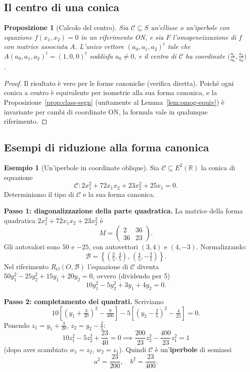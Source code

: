 \documentclass[11pt, a4paper]{book}
\theoremstyle{definition}
\newtheorem{esempio}[definizione]{Esempio}
\theoremstyle{plain}
\newtheorem{proposizione}[definizione]{Proposizione}
\theoremstyle{remark}
\newcommand{\R}{\mathbb{R}}
\begin{document}
\subsection{Il centro di una conica}

\begin{proposizione}[Calcolo del centro]
\label{prop:centro-conica}
Sia $\mathcal{C} \subseteq S$ un'ellisse o un'iperbole con equazione $f(x_1,x_2) = 0$ in un riferimento ON, e sia $F$ l'omogeneizzazione di $f$ con matrice associata $A$. L'unico vettore $(a_0, a_1, a_2)^t$ tale che $A(a_0, a_1, a_2)^t = (1, 0, 0)^t$ soddisfa $a_0 \neq 0$, e il centro di $\mathcal{C}$ ha coordinate $\bigl(\frac{a_1}{a_0}, \frac{a_2}{a_0}\bigr)$.
\end{proposizione}

\begin{proof}
Il risultato è vero per le forme canoniche (verifica diretta). Poiché ogni conica a centro è equivalente per isometrie alla sua forma canonica, e la Proposizione~\ref{prop:class-segn} (unitamente al Lemma~\ref{lem:omog-equiv}) è invariante per cambi di coordinate ON, la formula vale in qualunque riferimento.
\end{proof}

\subsection{Esempi di riduzione alla forma canonica}

\begin{exbox}
\begin{esempio}[Un'iperbole in coordinate oblique]
\label{es:iperbole-calc}
Sia $\mathcal{C} \subseteq E^2(\R)$ la conica di equazione
\[
  \mathcal{C} \colon 2x_1^2 + 72x_1 x_2 + 23x_2^2 + 25x_1 = 0.
\]
Determiniamo il tipo di $\mathcal{C}$ e la sua forma canonica.

\textbf{Passo 1: diagonalizzazione della parte quadratica.} La matrice della forma quadratica $2x_1^2 + 72x_1x_2 + 23x_2^2$ è
\[
  M = \begin{pmatrix} 2 & 36 \\ 36 & 23 \end{pmatrix}.
\]
Gli autovalori sono $50$ e $-25$, con autovettori $(3,4)$ e $(4,-3)$. Normalizzando:
\[
  \mathcal{B} = \left\{ \left(\tfrac{3}{5}, \tfrac{4}{5}\right),\, \left(\tfrac{4}{5}, -\tfrac{3}{5}\right) \right\}.
\]
Nel riferimento $R_O(O, \mathcal{B})$ l'equazione di $\mathcal{C}$ diventa $50y_1^2 - 25y_2^2 + 15y_1 + 20y_2 = 0$, ovvero (dividendo per 5)
\[
  10y_1^2 - 5y_2^2 + 3y_1 + 4y_2 = 0.
\]

\textbf{Passo 2: completamento dei quadrati.} Scriviamo
\[
  10\!\left[\left(y_1 + \tfrac{3}{20}\right)^2 - \tfrac{9}{400}\right] - 5\!\left[\left(y_2 - \tfrac{2}{5}\right)^2 - \tfrac{4}{25}\right] = 0.
\]
Ponendo $z_1 = y_1 + \frac{3}{20}$, $z_2 = y_2 - \frac{2}{5}$:
\[
  10z_1^2 - 5z_2^2 + \frac{23}{40} = 0 \implies \frac{200}{23}z_2^2 - \frac{400}{23}z_1^2 = 1
\]
(dopo aver scambiato $w_1 = z_2$, $w_2 = z_1$). Quindi $\mathcal{C}$ è un'\textbf{iperbole} di semiassi
\[
  a^2 = \frac{23}{200}, \quad b^2 = \frac{23}{400}.
\]
\end{esempio}
\end{exbox}
\end{document}
